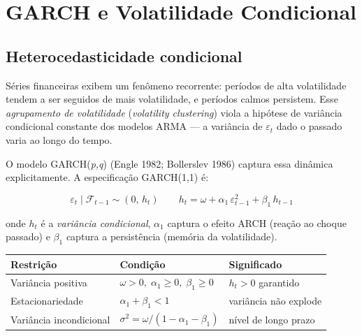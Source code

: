 \chapter{GARCH e Volatilidade Condicional}
\label{cap:garch}

\section{Heterocedasticidade condicional}

Séries financeiras exibem um fenômeno recorrente: períodos de alta
volatilidade tendem a ser seguidos de mais volatilidade, e períodos calmos
persistem. Esse \emph{agrupamento de volatilidade} (\textit{volatility
clustering}) viola a hipótese de variância condicional constante dos modelos
ARMA — a variância de $\varepsilon_t$ dado o passado varia ao longo do tempo.

O modelo GARCH(\textit{p,q}) (Engle 1982; Bollerslev 1986) captura essa
dinâmica explicitamente. A especificação GARCH(1,1) é:

\[
  \varepsilon_t \mid \mathcal{F}_{t-1} \sim (0,\, h_t)
  \qquad
  h_t = \omega + \alpha_1\,\varepsilon_{t-1}^2 + \beta_1\,h_{t-1}
\]

\noindent onde $h_t$ é a \emph{variância condicional}, $\alpha_1$ captura o
efeito ARCH (reação ao choque passado) e $\beta_1$ captura a persistência
(memória da volatilidade).

\begin{center}
\begin{tabular}{lll}
\toprule
\textbf{Restrição} & \textbf{Condição} & \textbf{Significado} \\
\midrule
Variância positiva  & $\omega > 0,\; \alpha_1 \geq 0,\; \beta_1 \geq 0$ & $h_t > 0$ garantido \\
Estacionariedade    & $\alpha_1 + \beta_1 < 1$                           & variância não explode \\
Variância incondicional & $\sigma^2 = \omega/(1-\alpha_1-\beta_1)$       & nível de longo prazo \\
\bottomrule
\end{tabular}
\end{center}

